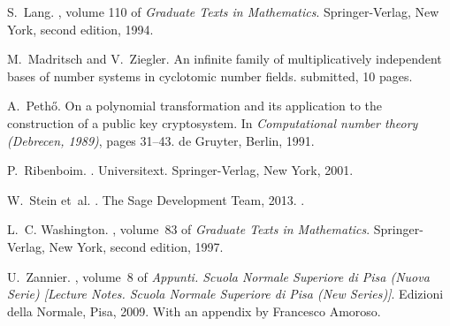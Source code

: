 \documentclass{amsart}
\theoremstyle{plain}
\numberwithin{equation}{section}
\theoremstyle{remark}
\begin{document}
\begin{thebibliography}{10}
S.~Lang.
, volume 110 of {\em Graduate Texts in
  Mathematics}.
\newblock Springer-Verlag, New York, second edition, 1994.

M.~Madritsch and V.~Ziegler.
\newblock An infinite family of multiplicatively independent bases of number
  systems in cyclotomic number fields.
\newblock submitted, 10 pages.

A.~Peth{\H o}.
\newblock On a polynomial transformation and its application to the
  construction of a public key cryptosystem.
\newblock In {\em Computational number theory ({D}ebrecen, 1989)}, pages
  31--43. de Gruyter, Berlin, 1991.

P.~Ribenboim.
.
\newblock Universitext. Springer-Verlag, New York, 2001.

W.~Stein et~al.
.
\newblock The Sage Development Team, 2013.
.

L.~C. Washington.
, volume~83 of {\em Graduate
  Texts in Mathematics}.
\newblock Springer-Verlag, New York, second edition, 1997.

U.~Zannier.
, volume~8 of {\em
  Appunti. Scuola Normale Superiore di Pisa (Nuova Serie) [Lecture Notes.
  Scuola Normale Superiore di Pisa (New Series)]}.
\newblock Edizioni della Normale, Pisa, 2009.
\newblock With an appendix by Francesco Amoroso.

\end{thebibliography}
\end{document}
